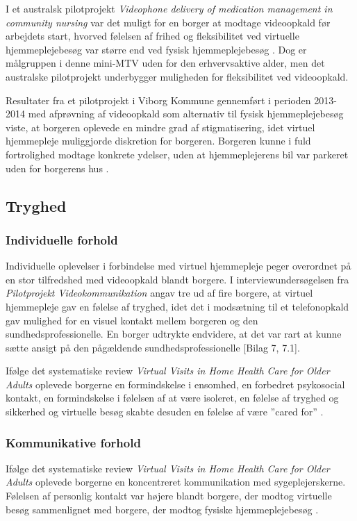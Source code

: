I et australsk pilotprojekt \textit{Videophone delivery of medication management in community nursing} var det muligt for en borger at modtage videoopkald før arbejdets start, hvorved følelsen af frihed og fleksibilitet ved virtuelle hjemmeplejebesøg var større end ved fysisk hjemmeplejebesøg \cite{wade}. Dog er målgruppen i denne mini-MTV uden for den erhvervsaktive alder, men det australske pilotprojekt underbygger muligheden for fleksibilitet ved videoopkald. 
 
Resultater fra et pilotprojekt i Viborg Kommune gennemført i perioden 2013-2014 med afprøvning af videoopkald som alternativ til fysisk hjemmeplejebesøg viste, at borgeren oplevede en mindre grad af stigmatisering, idet virtuel hjemmepleje muliggjorde diskretion for borgeren. Borgeren kunne i fuld fortrolighed modtage konkrete ydelser, uden at hjemmeplejerens bil var parkeret uden for borgerens hus \cite{kandidat}.

\subsection{Tryghed}
\subsubsection{Individuelle forhold}
Individuelle oplevelser i forbindelse med virtuel hjemmepleje peger overordnet på en stor tilfredshed med videoopkald blandt borgere. I interviewundersøgelsen fra \textit{Pilotprojekt Videokommunikation} angav tre ud af fire borgere, at virtuel hjemmepleje gav en følelse af tryghed, idet det i modsætning til et telefonopkald gav mulighed for en visuel kontakt mellem borgeren og den sundhedsprofessionelle. En borger udtrykte endvidere, at det var rart at kunne sætte ansigt på den pågældende sundhedsprofessionelle [Bilag 7, 7.1].

Ifølge det systematiske review \textit{Virtual Visits in Home Health Care for Older Adults} oplevede borgerne en formindskelse i ensomhed, en forbedret psykosocial kontakt, en formindskelse i følelsen af at være isoleret, en følelse af tryghed og sikkerhed og virtuelle besøg skabte desuden en følelse af være ”cared for” \cite{Baf2}.  

\subsubsection{Kommunikative forhold}
Ifølge det systematiske review \textit{Virtual Visits in Home Health Care for Older Adults} oplevede borgerne en koncentreret kommunikation med sygeplejerskerne. Følelsen af personlig kontakt var højere blandt borgere, der modtog virtuelle besøg sammenlignet med borgere, der modtog fysiske hjemmeplejebesøg \cite{Baf2}. 

